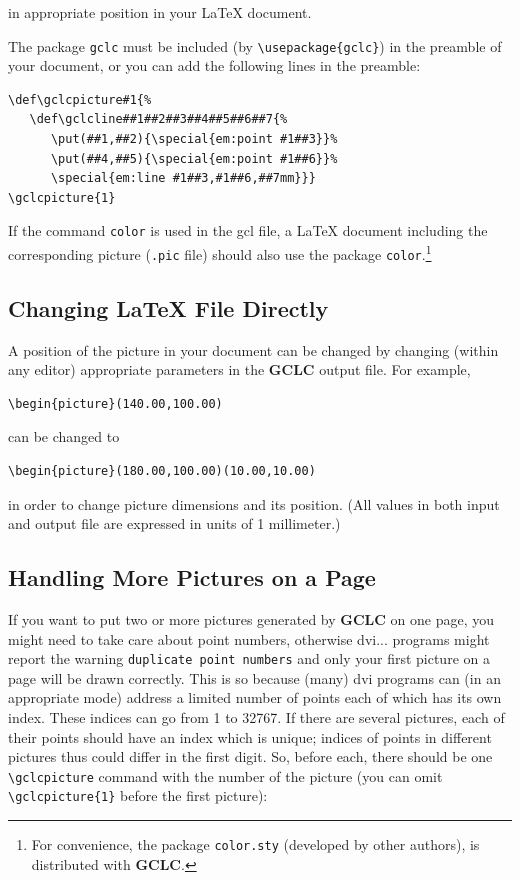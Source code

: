 \documentclass[a4paper]{book}
\newcommand{\gclc}{{\bfseries GCLC}\xspace}
\begin{document}
\noindent
in appropriate position in your \LaTeX{} document.

The package \verb|gclc| must be included (by \verb|\usepackage{gclc}|)
in the preamble of your document, or you can add the following lines
in the preamble:

\begin{verbatim}
\def\gclcpicture#1{%
   \def\gclcline##1##2##3##4##5##6##7{%
      \put(##1,##2){\special{em:point #1##3}}%
      \put(##4,##5){\special{em:point #1##6}}%
      \special{em:line #1##3,#1##6,##7mm}}}
\gclcpicture{1}
\end{verbatim}

If the command \verb|color| is used in the {\sc gcl} file, a \LaTeX{}
document including the corresponding picture (\verb|.pic| file) should
also use the package \verb|color|.\footnote{For convenience, the
package {\tt color.sty} (developed by other authors), is distributed
with \gclc.}


\subsection{Changing \LaTeX{} File Directly}

A position of the picture in your document can be changed by changing
(within any editor) appropriate parameters in the \gclc output file.
For example,

\begin{verbatim}
\begin{picture}(140.00,100.00)
\end{verbatim}

\noindent
can be changed to

\begin{verbatim}
\begin{picture}(180.00,100.00)(10.00,10.00)
\end{verbatim}

\noindent
in order to change picture dimensions and its position. (All values
in both input and output file are expressed in units of 1 millimeter.)


\subsection{Handling More Pictures on a Page}

If you want to put two or more pictures generated by \gclc on one
page, you might need to take care about point numbers, otherwise {\sc dvi}...
programs might report the warning \verb|duplicate point numbers| and
only your first picture on a page will be drawn correctly. This is
so because (many) {\sc dvi} programs can (in an appropriate mode)
address a limited number of points each of which has its own index.
These indices can go from 1 to 32767. If there are several pictures,
each of their points should have an index which is unique; indices
of points in different pictures thus could differ in the first digit.
So, before each, there should be one \verb|\gclcpicture| command with
the number of the picture (you can omit \verb|\gclcpicture{1}|
before the first picture):
\end{document}
